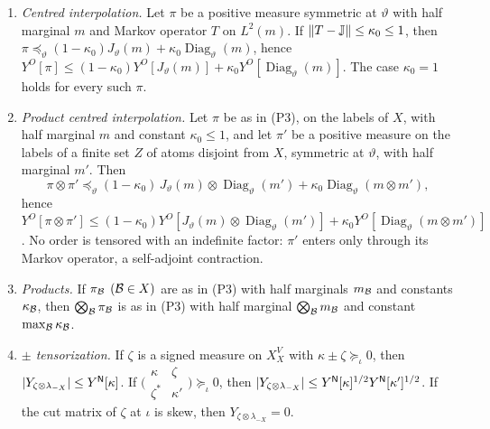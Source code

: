 \begin{lemma}
\begin{enumerate}[label=(P\arabic*)]
\item\label{it:record:P3} \emph{Centred interpolation.} Let $\pi$ be a positive
 measure symmetric at $\vartheta$ with half marginal $m$ and Markov operator
 $T$ on $L^2(m)$. If $\|T-\mathbb J\|\le\kappa_0\le1$, then
 $\pi\preceq_\vartheta(1-\kappa_0)J_\vartheta(m)
 +\kappa_0\operatorname{Diag}_\vartheta(m)$, hence $Y^O[\pi]\le(1-\kappa_0)
 Y^O[J_\vartheta(m)]+\kappa_0Y^O[\operatorname{Diag}_\vartheta(m)]$. The case
 $\kappa_0=1$ holds for every such $\pi$.
\item[(P3$'$)]\label{it:record:P3b}
 \emph{Product centred interpolation.} Let $\pi$ be as in (P3), on the labels
 of $X$, with half marginal $m$ and constant $\kappa_0\le1$, and let $\pi'$ be
 a positive measure on the labels of a finite set $Z$ of atoms disjoint from
 $X$, symmetric at $\vartheta$, with half marginal $m'$. Then
 \[
  \pi\otimes\pi'\preceq_\vartheta(1-\kappa_0)\,J_\vartheta(m)\otimes
  \operatorname{Diag}_\vartheta(m')+\kappa_0\operatorname{Diag}_\vartheta(m\otimes m'),
 \]
 hence $Y^O[\pi\otimes\pi']\le(1-\kappa_0)Y^O[J_\vartheta(m)\otimes
 \operatorname{Diag}_\vartheta(m')]+\kappa_0Y^O[\operatorname{Diag}_\vartheta(m\otimes
 m')]$. No order is tensored with an indefinite factor: $\pi'$ enters only
 through its Markov operator, a self-adjoint contraction.
\item\label{it:record:P4} \emph{Products.} If $\pi_\mathcal B$ $(\mathcal B\in X)$ are as in
 (P3) with half marginals $m_\mathcal B$ and constants $\kappa_\mathcal B$, then
 $\bigotimes_\mathcal B\pi_\mathcal B$ is as in (P3) with half marginal
 $\bigotimes_\mathcal B m_\mathcal B$ and constant $\max_\mathcal B\kappa_\mathcal B$.
\item\label{it:record:P5} \emph{$\pm$ tensorization.} If $\zeta$ is a signed
 measure on $X_X^V$ with $\kappa\pm\zeta\succeq_\iota0$, then
 $|Y_{\zeta\otimes\lambda_{-X}}|\le Y^{\mathsf N}[\kappa]$. If
 $\bigl(\begin{smallmatrix}\kappa&\zeta\\ \zeta^*&\kappa'\end{smallmatrix}
 \bigr)\succeq_\iota0$, then $|Y_{\zeta\otimes\lambda_{-X}}|\le
 Y^{\mathsf N}[\kappa]^{1/2}Y^{\mathsf N}[\kappa']^{1/2}$. If the cut matrix of $\zeta$ at
 $\iota$ is skew, then $Y_{\zeta\otimes\lambda_{-X}}=0$.
\end{enumerate}
\end{lemma}

